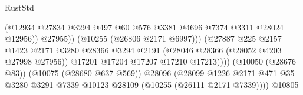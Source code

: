 \begin{lexlean}{RustStd}
\begin{coremodule}
                                                        (@12934
                                                          @27834
                                                          @3294
                                                          @497
                                                          @60
                                                          @576
                                                          @3381
                                                          @4696
                                                          @7374
                                                          @3311
                                                          @28024
                                                          @12956))
                                                      @27955))
                                                  (@10255 (@26806 @2171 @6997)))
                                                (@27887
                                                  @225
                                                  @2157
                                                  @1423
                                                  @2171
                                                  @3280
                                                  @28366
                                                  @3294
                                                  @2191
                                                  (@28046 @28366 (@28052 @4203 @27998 @27956))
                                                  @17201
                                                  @17204
                                                  @17207
                                                  @17210
                                                  @17213))))
                                          (@10050 (@28676 @83))
                                          (@10075 (@28680 @637 @569))
                                          @28096
                                          (@28099
                                            @1226
                                            @2171
                                            @471
                                            @35
                                            @3280
                                            @3291
                                            @7339
                                            @10123
                                            @28109
                                            (@10255 (@26111 @2171 @7339))))
                                        @10805

\end{coremodule}
\end{lexlean}
